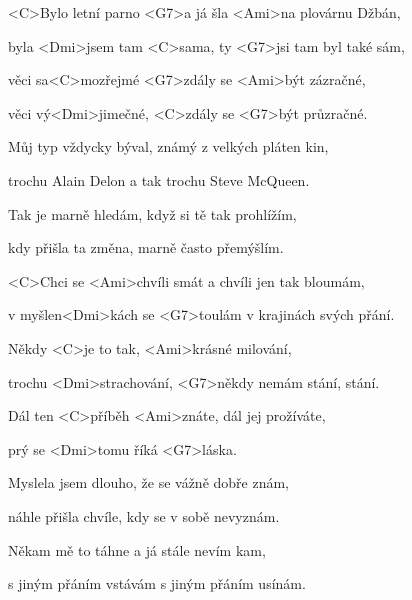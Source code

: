 

\zs
<C>Bylo letní parno <G7>a já šla <Ami>na plovárnu Džbán,

byla <Dmi>jsem tam <C>sama, ty <G7>jsi tam byl také sám,

věci sa<C>mozřejmé <G7>zdály se <Ami>být zázračné,

věci vý<Dmi>jimečné, <C>zdály se <G7>být průzračné.
\ks

\zs   
Můj typ vždycky býval, známý z velkých pláten kin,

trochu Alain Delon a tak trochu Steve McQueen.

Tak je marně hledám, když si tě tak prohlížím,

kdy přišla ta změna, marně často přemýšlím.
\ks 

\zr
<C>Chci se <Ami>chvíli smát a chvíli jen tak bloumám,

v myšlen<Dmi>kách se <G7>toulám v krajinách svých přání.

Někdy <C>je to tak, <Ami>krásné milování,

trochu <Dmi>strachování, <G7>někdy nemám stání, stání.

Dál ten <C>příběh <Ami>znáte, dál jej prožíváte, 

prý se <Dmi>tomu říká <G7>láska.
\kr

\zs
Myslela jsem dlouho, že se vážně dobře znám,

náhle přišla chvíle, kdy se v sobě nevyznám.

Někam mě to táhne a já stále nevím kam,

s jiným přáním vstávám s jiným přáním usínám.
\ks

\zr
\kr

\kp
